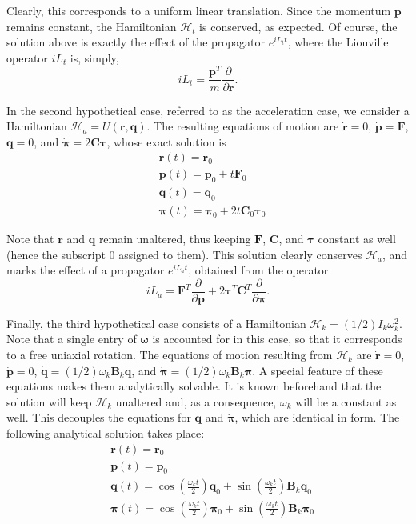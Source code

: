 \documentclass[aip,jcp,reprint,amsmath,amssymb]{revtex4-1}
\newcommand{\mt}[1]{\boldsymbol{\mathbf{#1}}}           %
\newcommand{\vt}[1]{\boldsymbol{\mathbf{#1}}}           %
\newcommand{\tr}[1]{#1^T}                               %
\newcommand{\diff}[2]{\dfrac{\partial #1}{\partial #2}} %
\begin{document}
Clearly, this corresponds to a uniform linear translation. Since the momentum $\vt p$ remains constant, the Hamiltonian $\mathcal{H}_t$ is conserved, as expected. Of course, the solution above is exactly the effect of the propagator $e^{i L_t t}$, where the Liouville operator $i L_t$ is, simply,
\[
i L_t = \frac{\tr{\vt p}}{m}\diff{}{\vt r}.
\]

In the second hypothetical case, referred to as the acceleration case, we consider a Hamiltonian $\mathcal{H}_a = U(\vt r, \vt q)$. The resulting equations of motion are $\dot{\vt r} = 0$, $\dot{\vt p} = \vt F$, $\dot{\vt q} = 0$, and $\dot{\vt \pi} = 2 \mt C \vt \tau$, whose exact solution is
\begin{align*}
&{\vt r}(t) = {\vt r}_0 \\
&{\vt p}(t) = {\vt p}_0 + t \vt F_0 \\
&{\vt q}(t) = {\vt q}_0 \\
&{\vt \pi}(t) = {\vt \pi}_0 +  2 t \mt C_0 \vt \tau_0
\end{align*}

Note that $\vt r$ and $\vt q$ remain unaltered, thus keeping $\vt F$, $\mt C$, and $\vt \tau$ constant as well (hence the subscript $0$ assigned to them). This solution clearly conserves $\mathcal{H}_a$, and marks the effect of a propagator $e^{i L_a t}$, obtained from the operator
\[
i L_a = \tr{\vt F} \diff{}{\vt p} + 2 \tr{\vt \tau} \tr{\mt C} \diff{}{\vt \pi}.
\]

Finally, the third hypothetical case consists of a Hamiltonian $\mathcal{H}_k = (1/2) I_k \omega_k^2$. Note that a single entry of $\vt \omega$ is accounted for in this case, so that it corresponds to a free uniaxial rotation. The equations of motion resulting from $\mathcal{H}_k$ are $\dot{\vt r} = 0$, $\dot{\vt p} = 0$, $\dot{\vt q} = (1/2) \omega_k {\mt B}_k \vt q$, and $\dot{\vt \pi} = (1/2) \omega_k {\mt B}_k \vt \pi$. A special feature of these equations makes them analytically solvable. It is known beforehand that the solution will keep $\mathcal{H}_k$ unaltered and, as a consequence, $\omega_k$ will be a constant as well. This decouples the equations for $\dot{\vt q}$ and $\dot{\vt \pi}$, which are identical in form. The following analytical solution takes place:\cite{Miller2002}
\begin{align}
&{\vt r}(t) = {\vt r}_0 \\
&{\vt p}(t) = {\vt p}_0 \\
&{\vt q}(t) = \cos\left(\frac{\omega_k t}{2}\right) \vt q_0 + \sin\left(\frac{\omega_k t}{2}\right) \mt B_k \vt q_0 \\
&{\vt \pi}(t) = \cos\left(\frac{\omega_k t}{2}\right) \vt \pi_0 + \sin\left(\frac{\omega_k t}{2}\right) \mt B_k \vt \pi_0
\end{align}
\end{document}
